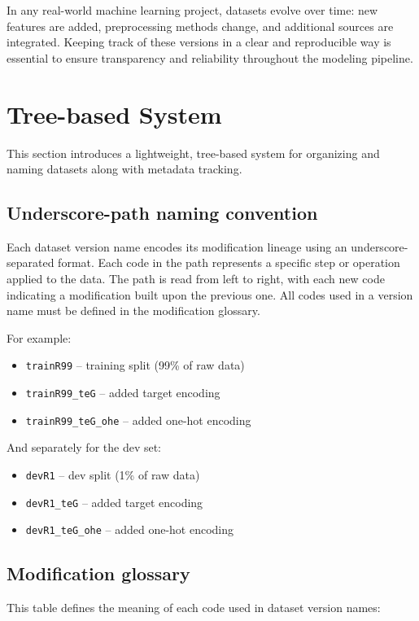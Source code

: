 \documentclass[12pt,openany]{book}
\begin{document}
In any real-world machine learning project, datasets evolve over time: new features are added, preprocessing methods change, and additional sources are integrated. Keeping track of these versions in a clear and reproducible way is essential to ensure transparency and reliability throughout the modeling pipeline.



\section{Tree-based System}

This section introduces a lightweight, tree-based system for organizing and naming datasets along with metadata tracking. 


\subsection{Underscore-path naming convention}

Each dataset version name encodes its modification lineage using an underscore-separated format. Each code in the path represents a specific step or operation applied to the data. The path is read from left to right, with each new code indicating a modification built upon the previous one. All codes used in a version name must be defined in the modification glossary.
\newline

For example:

\begin{itemize}
    \item \texttt{trainR99} -- training split (99\% of raw data)
    \item \texttt{trainR99\_teG} -- added target encoding
    \item \texttt{trainR99\_teG\_ohe} -- added one-hot encoding
\end{itemize}

And separately for the dev set:

\begin{itemize}
    \item \texttt{devR1} -- dev split (1\% of raw data)
    \item \texttt{devR1\_teG} -- added target encoding
    \item \texttt{devR1\_teG\_ohe} -- added one-hot encoding
\end{itemize}


\subsection{Modification glossary}
This table defines the meaning of each code used in dataset version names:
\newline
\end{document}
